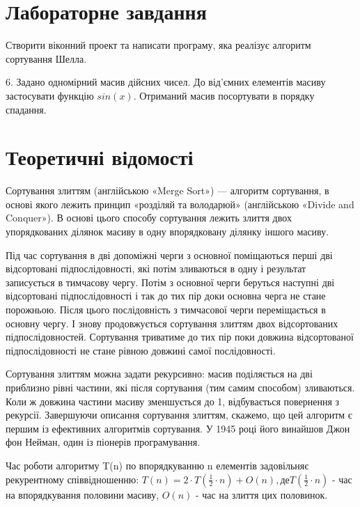\documentclass{article}
\begin{document}
\begin{normalsize}
		\section*{Лабораторне завдання}
		Створити віконний проект та написати програму, яка реалізує алгоритм сортування Шелла.
		\begin{center}
			6. Задано одномірний масив дійсних чисел. До від’ємних елементів масиву застосувати функцію $sin(x)$. Отриманий масив посортувати в порядку спадання.
		\end{center}
		
		\section*{Теоретичні відомості}
	Сортування злиттям (англійською «Merge Sort») — алгоритм сортування, в основі якого лежить принцип «розділяй та володарюй» (англійською «Divide and Conquer»). В основі цього способу сортування лежить злиття двох упорядкованих ділянок масиву в одну впорядковану ділянку іншого масиву.
	
	Під час сортування в дві допоміжні черги з основної поміщаються перші дві відсортовані підпослідовності, які потім зливаються в одну і результат записується в тимчасову чергу. Потім з основної черги беруться наступні дві відсортовані підпослідовності і так до тих пір доки основна черга не стане порожньою. Після цього послідовність з тимчасової черги переміщається в основну чергу. І знову продовжується сортування злиттям двох відсортованих підпослідовностей. Сортування триватиме до тих пір поки довжина відсортованої підпослідовності не стане рівною довжині самої послідовності.
	
	Сортування злиттям можна задати рекурсивно: масив поділяється на дві приблизно рівні частини, які після сортування (тим самим способом) зливаються. Коли ж довжина частини масиву зменшується до 1, відбувається повернення з рекурсії. Завершуючи описання сортування злиттям, скажемо, що цей алгоритм є першим із ефективних алгоритмів сортування. У 1945 році його винайшов Джон фон Нейман, один із піонерів програмування.
	
	Час роботи алгоритму T(n) по впорядкуванню n елементів задовільняє рекурентному співвідношенню: $T(n) = 2\cdot T(\frac{1}{2}\cdot n) + O(n), деT(\frac{1}{2}\cdot n)$ - час на впорядкування половини масиву, $O(n)$ - час на злиття цих половинок.
		

\end{normalsize}
\end{document}
